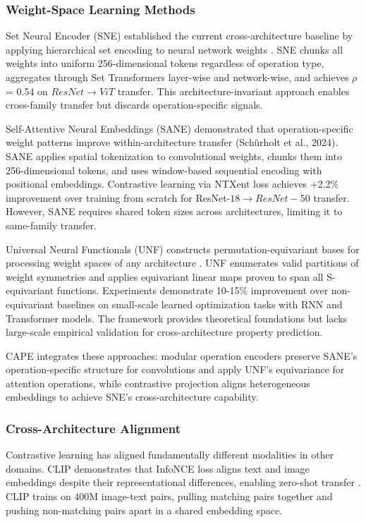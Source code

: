 
\subsubsection{Weight-Space Learning Methods}

Set Neural Encoder (SNE) established the current cross-architecture baseline by applying hierarchical set encoding to neural network weights \citep{Andreis2023}. SNE chunks all weights into uniform 256-dimensional tokens regardless of operation type, aggregates through Set Transformers layer-wise and network-wise, and achieves $\rho$ = 0.54 on $ResNet\rightarrow ViT$ transfer. This architecture-invariant approach enables cross-family transfer but discards operation-specific signals.

Self-Attentive Neural Embeddings (SANE) demonstrated that operation-specific weight patterns improve within-architecture transfer (Schürholt et al., 2024). SANE applies spatial tokenization to convolutional weights, chunks them into 256-dimensional tokens, and uses window-based sequential encoding with positional embeddings. Contrastive learning via NTXent loss achieves +2.2\% improvement over training from scratch for ResNet-$18\rightarrow ResNet-50$ transfer. However, SANE requires shared token sizes across architectures, limiting it to same-family transfer.

Universal Neural Functionals (UNF) constructs permutation-equivariant bases for processing weight spaces of any architecture \citep{Zhou2024}. UNF enumerates valid partitions of weight symmetries and applies equivariant linear maps proven to span all S-equivariant functions. Experiments demonstrate 10-15\% improvement over non-equivariant baselines on small-scale learned optimization tasks with RNN and Transformer models. The framework provides theoretical foundations but lacks large-scale empirical validation for cross-architecture property prediction.

CAPE integrates these approaches: modular operation encoders preserve SANE's operation-specific structure for convolutions and apply UNF's equivariance for attention operations, while contrastive projection aligns heterogeneous embeddings to achieve SNE's cross-architecture capability.

\subsubsection{Cross-Architecture Alignment}

Contrastive learning has aligned fundamentally different modalities in other domains. CLIP demonstrates that InfoNCE loss aligns text and image embeddings despite their representational differences, enabling zero-shot transfer \citep{Radford2021}. CLIP trains on 400M image-text pairs, pulling matching pairs together and pushing non-matching pairs apart in a shared embedding space.

